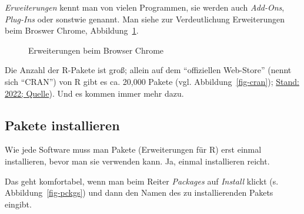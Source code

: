 \documentclass[
  a4paper,
  DIV=11]{scrreprt}
\theoremstyle{definition}
\theoremstyle{definition}
\theoremstyle{definition}
\theoremstyle{remark}
\begin{document}
\emph{Erweiterungen} kennt man von vielen Programmen, sie werden auch
\emph{Add-Ons}, \emph{Plug-Ins} oder sonstwie genannt. Man siehe zur
Verdeutlichung Erweiterungen beim Broswer Chrome,
Abbildung~\ref{fig-chrome}.

\begin{figure}


\caption{\label{fig-chrome}Erweiterungen beim Browser Chrome}

\end{figure}%

Die Anzahl der R-Pakete ist groß; allein auf dem ``offiziellen
Web-Store'' (nennt sich ``CRAN'') von R gibt es ca. 20,000 Pakete (vgl.
Abbildung~\ref{fig-cran});
\href{https://gist.github.com/daroczig/3cf06d6db4be2bbe3368}{Stand:
2022; Quelle}). Und es kommen immer mehr dazu.

\subsection{Pakete installieren}\label{install-r-pckgs}

Wie jede Software muss man Pakete (Erweiterungen für R) erst einmal
installieren, bevor man sie verwenden kann. Ja, einmal installieren
reicht.

Das geht komfortabel, wenn man beim Reiter \emph{Packages} auf
\emph{Install} klickt (s. Abbildung~\ref{fig-pckgs}) und dann den Namen
des zu installierenden Pakets eingibt.
\end{document}
